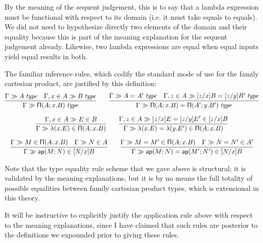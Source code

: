 \documentclass[main.tex]{subfiles}
\begin{document}
By the meaning of the sequent judgement, this is to say that a lambda
expression must be functional with respect to its domain (i.e. it must take
equals to equals). We did not need to hypothesize directly two elements of the
domain and their equality because this is part of the meaning explanation for
the sequent judgement already. Likewise, two lambda expressions are equal when
equal inputs yield equal results in both.

The familiar inference rules, which codify the standard mode of use for the
family cartesian product, are justified by this definition:
\begin{gather*}
  \infer{
    \sequent\Gamma\isset{\typrod{A}{x}{B}}
  }{
    \sequent\Gamma\isset{A} &
    \sequent{\Gamma,\ver{x}{A}}{\isset{B}}
  }\qquad
  \infer{
    \sequent\Gamma\isset{\typrod{A}{x}{B}=\typrod{A'}{y}{B'}}
  }{
   \sequent\Gamma\isset{A=A'} &
    \sequent{\Gamma,\ver{z}{A}}{\isset{[z/x]B=[z/y]B'}}
  }\\[6pt]
  \infer{
    \sequent\Gamma\ver{\lam{x}{E}}{\typrod{A}{x}{B}}
  }{
    \sequent{\Gamma,\ver{x}{A}}{\ver{E}{B}}
  }\qquad
  \infer{
    \sequent\Gamma\ver{\lam{x}{E}=\lam{y}{E'}}{\typrod{A}{x}{B}}
  }{
    \sequent{\Gamma,\ver{z}{A}}{\ver{[z/x]E=[z/y]E'}{[z/x]B}}
  }\\[6pt]
  \infer{
    \sequent\Gamma\ver{\ap{M}{N}}{[N/x]B}
  }{
    \sequent\Gamma\ver{M}{\typrod{A}{x}{B}} &
    \sequent\Gamma\ver{N}{A}
  }\qquad
  \infer{
    \sequent\Gamma\ver{\ap{M}{N}=\ap{M'}{N'}}{[N/x]B}
  }{
    \sequent\Gamma\ver{M=M'}{\typrod{A}{x}{B}} &
    \sequent\Gamma\ver{N=N'}{A'}
  }
\end{gather*}

Note that the type equality rule scheme that we gave above is structural; it is
validated by the meaning explanations, but it is by no means the full totality
of possible equalities between family cartesian product types, which is
extensional in this theory.

It will be instructive to explicitly justify the application rule above with
respect to the meaning explanations, since I have claimed that such rules are
posterior to the definitions we expounded prior to giving these rules.
\end{document}
